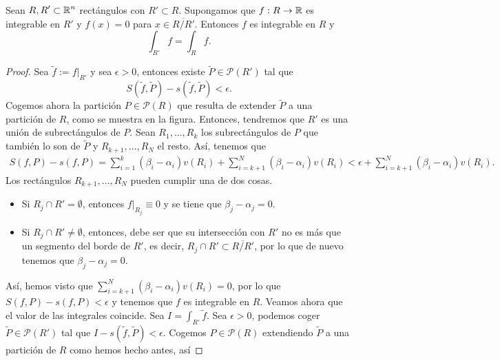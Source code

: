 \begin{lema}
Sean $\displaystyle R, R' \subset \mathbb{R}^{n} $ rectángulos con $\displaystyle R' \subset R $. Supongamos que $\displaystyle f : R \to \mathbb{R} $ es integrable en $\displaystyle R' $ y $\displaystyle f\left(x\right) = 0 $ para $\displaystyle x \in \overline{R/R'} $. Entonces $\displaystyle f $ es integrable en $\displaystyle R $ y 
\[\int _{R'}f =\int _{R}f .\]
\end{lema}
\begin{proof}
	Sea $\displaystyle \tilde{f} := f|_{R'} $ y sea $\displaystyle \epsilon > 0 $, entonces existe $\displaystyle \tilde{P} \in \mathcal{P}\left(R'\right) $ tal que 
	\[S\left(\tilde{f}, \tilde{P}\right)-s\left(\tilde{f}, \tilde{P}\right) < \epsilon  .\]
	Cogemos ahora la partición $\displaystyle P \in \mathcal{P}\left(R\right) $ que resulta de extender $\displaystyle \tilde{P} $ a una partición de $\displaystyle R $, como se muestra en la figura. 
	Entonces, tendremos que $\displaystyle R' $ es una unión de subrectángulos de $\displaystyle P $. Sean $\displaystyle R_{1}, \ldots, R_{k} $ los subrectángulos de $\displaystyle P $ que también lo son de $\displaystyle \tilde{P} $ y $\displaystyle R_{k+1}, \ldots, R_{N} $ el resto. Así, tenemos que 
\[
\begin{split}
S\left(f, P\right)-s\left(f,P\right) = \sum^{k}_{i = 1}\left(\beta_{i}-\alpha_{i}\right)v\left(R_{i}\right) + \sum^{N}_{i = k + 1}\left(\beta_{i}-\alpha_{i}\right)v\left(R_{i}\right) < \epsilon + \sum^{N}_{i = k + 1}\left(\beta_{i}-\alpha_{i}\right)v\left(R_{i}\right) .
\end{split}
\]
Los rectángulos $\displaystyle R_{k+1}, \ldots, R_{N} $ pueden cumplir una de dos cosas.
\begin{itemize}
\item Si $\displaystyle R_{j} \cap R' = \emptyset $, entonces $\displaystyle f|_{R_{j}} \equiv 0 $ y se tiene que $\displaystyle \beta_{j}-\alpha_{j} = 0 $.
\item Si $\displaystyle R_{j} \cap R' \neq \emptyset $, entonces, debe ser que su intersección con $\displaystyle R' $ no es más que un segmento del borde de $\displaystyle R' $, es decir, $\displaystyle R_{j} \cap R' \subset \overline{R/R'} $, por lo que de nuevo tenemos que $\displaystyle \beta_{j}-\alpha_{j} = 0 $. 
\end{itemize}
Así, hemos visto que $\displaystyle \sum^{N}_{i=k+1}\left(\beta_{i}-\alpha_{i}\right)v\left(R_{i}\right)= 0 $, por lo que $\displaystyle S\left(f,P\right)-s\left(f,P\right) < \epsilon  $ y tenemos que $\displaystyle f $ es integrable en $\displaystyle R $. Veamos ahora que el valor de las integrales coincide. Sea $\displaystyle I = \int _{R'}\tilde{f} $. Sea $\displaystyle \epsilon > 0 $, podemos coger $\displaystyle \tilde{P} \in \mathcal{P}\left(R'\right) $ tal que $\displaystyle I - s\left(\tilde{f}, \tilde{P}\right) < \epsilon  $. Cogemos $\displaystyle P \in \mathcal{P}\left(R\right) $ extendiendo $\displaystyle \tilde{P} $ a una partición de $\displaystyle R $ como hemos hecho antes, así

\end{proof}
